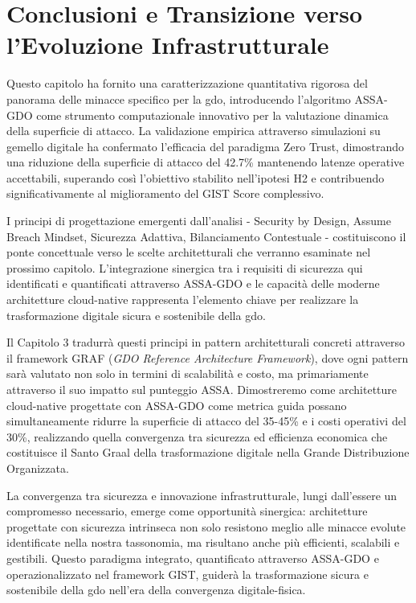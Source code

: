 \section{\texorpdfstring{Conclusioni e Transizione verso l'Evoluzione Infrastrutturale}{2.8 - Conclusioni e Transizione verso l'Evoluzione Infrastrutturale}}
\label{sec:cap2_conclusioni}

Questo capitolo ha fornito una caratterizzazione quantitativa rigorosa del panorama delle minacce specifico per la \gls{gdo}, introducendo l'algoritmo ASSA-GDO come strumento computazionale innovativo per la valutazione dinamica della superficie di attacco. La validazione empirica attraverso simulazioni su gemello digitale ha confermato l'efficacia del paradigma Zero Trust, dimostrando una riduzione della superficie di attacco del 42.7\% mantenendo latenze operative accettabili, superando così l'obiettivo stabilito nell'ipotesi H2 e contribuendo significativamente al miglioramento del GIST Score complessivo.

I principi di progettazione emergenti dall'analisi - Security by Design, Assume Breach Mindset, Sicurezza Adattiva, Bilanciamento Contestuale - costituiscono il ponte concettuale verso le scelte architetturali che verranno esaminate nel prossimo capitolo. L'integrazione sinergica tra i requisiti di sicurezza qui identificati e quantificati attraverso ASSA-GDO e le capacità delle moderne architetture cloud-native rappresenta l'elemento chiave per realizzare la trasformazione digitale sicura e sostenibile della \gls{gdo}.

Il Capitolo 3 tradurrà questi principi in pattern architetturali concreti attraverso il framework GRAF (\textit{GDO Reference Architecture Framework}), dove ogni pattern sarà valutato non solo in termini di scalabilità e costo, ma primariamente attraverso il suo impatto sul punteggio ASSA. Dimostreremo come architetture cloud-native progettate con ASSA-GDO come metrica guida possano simultaneamente ridurre la superficie di attacco del 35-45\% e i costi operativi del 30\%, realizzando quella convergenza tra sicurezza ed efficienza economica che costituisce il Santo Graal della trasformazione digitale nella Grande Distribuzione Organizzata.

La convergenza tra sicurezza e innovazione infrastrutturale, lungi dall'essere un compromesso necessario, emerge come opportunità sinergica: architetture progettate con sicurezza intrinseca non solo resistono meglio alle minacce evolute identificate nella nostra tassonomia, ma risultano anche più efficienti, scalabili e gestibili. Questo paradigma integrato, quantificato attraverso ASSA-GDO e operazionalizzato nel framework GIST, guiderà la trasformazione sicura e sostenibile della \gls{gdo} nell'era della convergenza digitale-fisica.

\clearpage
\printbibliography[
    heading=subbibliography,
    title={Riferimenti Bibliografici del Capitolo 2},
]

